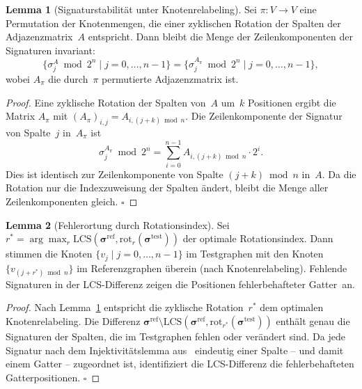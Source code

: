 ﻿\documentclass[a4paper,12pt]{article}
\theoremstyle{definition}
\newtheorem{lemma}{Lemma}
\begin{document}
\begin{lemma}[Signaturstabilität unter Knotenrelabeling]
  \label{lem:relabeling}
  Sei $\pi: V \to V$ eine Permutation der Knotenmengen, die einer
  zyklischen Rotation der Spalten der Adjazenzmatrix~$A$ entspricht.
  Dann bleibt die Menge der Zeilenkomponenten der Signaturen invariant:
  \[
    \bigl\{\sigma_j^A \bmod 2^n \mid j = 0, \ldots, n-1\bigr\}
    = \bigl\{\sigma_j^{A_\pi} \bmod 2^n \mid j = 0, \ldots, n-1\bigr\},
  \]
  wobei $A_\pi$ die durch~$\pi$ permutierte Adjazenzmatrix ist.
\end{lemma}

\begin{proof}
  Eine zyklische Rotation der Spalten von~$A$ um~$k$ Positionen ergibt
  die Matrix $A_\pi$ mit $(A_\pi)_{i,j} = A_{i,(j+k)\bmod n}$.
  Die Zeilenkomponente der Signatur von Spalte~$j$ in~$A_\pi$ ist
  \[
    \sigma_j^{A_\pi} \bmod 2^n
    = \sum_{i=0}^{n-1} A_{i,(j+k)\bmod n} \cdot 2^i.
  \]
  Dies ist identisch zur Zeilenkomponente von Spalte
  $(j+k) \bmod n$ in~$A$.
  Da die Rotation nur die Indexzuweisung der Spalten ändert, bleibt
  die Menge aller Zeilenkomponenten gleich. $\square$
\end{proof}

\begin{lemma}[Fehlerortung durch Rotationsindex]
  \label{lem:fehlerortung}
  Sei $r^* = \arg\max_{r} \mathrm{LCS}(\boldsymbol{\sigma}^{\mathrm{ref}},
  \mathrm{rot}_r(\boldsymbol{\sigma}^{\mathrm{test}}))$ der optimale
  Rotationsindex.
  Dann stimmen die Knoten $\{v_j \mid j = 0, \ldots, n-1\}$ im
  Testgraphen mit den Knoten $\{v_{(j+r^*)\bmod n}\}$ im
  Referenzgraphen überein (nach Knotenrelabeling).
  Fehlende Signaturen in der LCS-Differenz zeigen die Positionen
  fehler\-behafteter Gatter~an.
\end{lemma}

\begin{proof}
  Nach Lemma~\ref{lem:relabeling} entspricht die zyklische Rotation~$r^*$
  dem optimalen Knotenrelabeling.
  Die Differenz
  $\boldsymbol{\sigma}^{\mathrm{ref}} \setminus
  \mathrm{LCS}(\boldsymbol{\sigma}^{\mathrm{ref}},
  \mathrm{rot}_{r^*}(\boldsymbol{\sigma}^{\mathrm{test}}))$
  enthält genau die Signaturen der Spalten, die im Testgraphen fehlen
  oder verändert sind.
  Da jede Signatur nach dem Injektivitäts\-lemma aus~\cite{epp2026subgraph}
  eindeutig einer Spalte -- und damit einem Gatter -- zugeordnet ist,
  identifiziert die LCS-Differenz die fehler\-behafteten Gatter\-positionen.
  $\square$
\end{proof}
\end{document}
